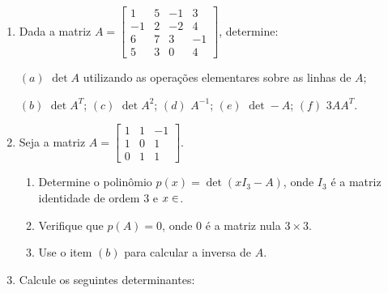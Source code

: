 \documentclass{report}
\begin{document}
\begin{Exercise}
\begin{enumerate}

\item \label{1lista31} Dada a matriz $A= \left[
\begin{array}{rrrr}
1 & 5 & -1 & 3 \\
-1 & 2 & -2 & 4 \\
6 & 7 & 3 & -1 \\
5 & 3 & 0 & 4
\end{array}
\right]$, determine:

$(a)$ $\det A$ utilizando as operações elementares sobre as linhas
de $A$;

$(b)$ $\det A^T$; \hspace{0.5cm} $(c)$ $\det A^2$; \hspace{0.5cm}
$(d)$ $A^{-1}$; \hspace{0.5cm} $(e)$ $\det -A$; \hspace{0.5cm}
$(f)$ $3AA^T$.


\item \label{1lista32} Seja a matriz $A=\left[
\begin{array}{rrr}
1 & 1 & -1 \\
1 & 0 & 1 \\
0 & 1 & 1
\end{array}
\right].$
\begin{enumerate}
    \item Determine o polinômio $p(x)=\det (xI_3 -A)$, onde $I_3$
    é a matriz identidade de ordem $3$ e $x \in \real$.
    \item Verifique que $p(A)=0$, onde $0$ é a matriz nula $3
    \times 3$.
    \item Use o item $(b)$ para calcular a inversa de $A$.
\end{enumerate}


\item \label{1lista33}  Calcule os seguintes determinantes:

\medskip


\end{enumerate}
\end{Exercise}
\end{document}
